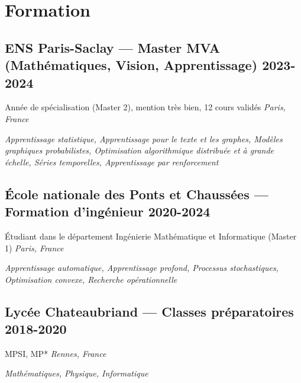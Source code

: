 \section{Formation}

\subsection{ENS Paris-Saclay --- Master MVA (Mathématiques, Vision, Apprentissage) \hfill \textbf{2023-2024}}
Année de spécialisation (Master 2), mention très bien, 12 cours validés \hfill \textit{Paris, France}\par
\textit{Apprentissage statistique, Apprentissage pour le texte et les graphes, Modèles graphiques probabilistes, Optimisation algorithmique distribuée et à grande échelle, Séries temporelles, Apprentissage par renforcement}

\subsection{École nationale des Ponts et Chaussées --- Formation d'ingénieur \hfill \textbf{2020-2024}}
Étudiant dans le département Ingénierie Mathématique et Informatique (Master 1) \hfill \textit{Paris, France}\par
\textit{Apprentissage automatique, Apprentissage profond, Processus stochastiques, Optimisation convexe, Recherche opérationnelle}

\subsection{Lycée Chateaubriand --- Classes préparatoires \hfill \textbf{2018-2020}}
MPSI, MP* \hfill \textit{Rennes, France}\par
\textit{Mathématiques, Physique, Informatique}
